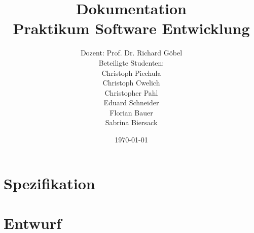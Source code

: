 \documentclass[11pt,dvipsnames]{scrreprt}%
\title{Dokumentation\\
Praktikum Software Entwicklung }
\author{Dozent: Prof. Dr. Richard Göbel \\
Beteiligte Studenten: \\
Christoph Piechula \\
Christoph Cwelich \\
Christopher Pahl\\
Eduard Schneider \\
Florian Bauer \\
Sabrina Biersack \\
}
\date{\today}
\begin{document}
\graphicspath{
{./analyse/img/}
}
\maketitle

\tableofcontents

\part{Spezifikation}




\part{Entwurf}


\end{document}

